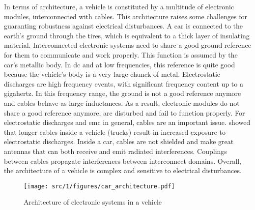In terms of architecture, a vehicle is constituted by a multitude of electronic modules, interconnected with cables.
This architecture raises some challenges for guaranting robustness against electrical disturbances.
A car is connected to the earth's ground through the tires, which is equivalent to a thick layer of insulating material.
Interconnected electronic systems need to share a good ground reference for them to communicate and work properly.
This function is assumed by the car's metallic body.
In \gls{dc} and at low frequencies, this reference is quite good because the vehicle's body is a very large chunck of metal.
Electrostatic discharges are high frequency events, with significant frequency content up to a gigahertz.
In this frequency range, the ground is not a good reference anymore and cables behave as large inductances.
As a result, electronic modules do not share a good reference anymore, are disturbed and fail to function properly.
For electrostatic discharges and \gls{emc} in general, cables are an important issue.
\cite{Renault-esd} showed that longer cables inside a vehicle (trucks) result in increased exposure to electrostatic discharges.
Inside a car, cables are not shielded and make great antennas that can both receive and emit radiated interferences.
Couplings between cables propagate interferences between interconnect domains.
Overall, the architecture of a vehicle is complex and sensitive to electrical disturbances.

\begin{figure}[!h]
  \centering
  \texttt{[image: src/1/figures/car\_architecture.pdf]}
  \caption{Architecture of electronic systems in a vehicle}
  \label{fig:car-architecture}
\end{figure}

